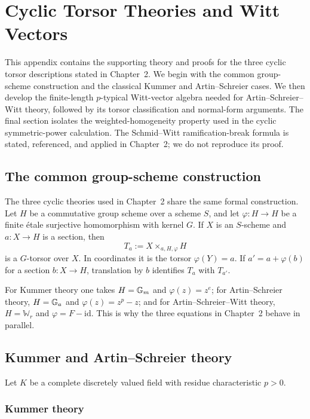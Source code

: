 \chapter{Cyclic Torsor Theories and Witt Vectors}
\label{appendix:witt_vector_algebra}
\label{appendix:cyclic_torsor_theories}

This appendix contains the supporting theory and proofs for the three cyclic
torsor descriptions stated in Chapter~2. We begin with the common
group-scheme construction and the classical Kummer and Artin--Schreier cases.
We then develop the finite-length \(p\)-typical Witt-vector algebra needed for
Artin--Schreier--Witt theory, followed by its torsor classification and
normal-form arguments. The final section isolates the weighted-homogeneity
property used in the cyclic symmetric-power calculation. The Schmid--Witt
ramification-break formula is stated, referenced, and applied in Chapter~2;
we do not reproduce its proof.

\providecommand{\bW}{\mathbb{W}}

\section{The common group-scheme construction}

The three cyclic theories used in Chapter~2 share the same formal
construction. Let $H$ be a commutative group scheme over a scheme $S$, and let
$\varphi:H\to H$ be a finite \'etale surjective homomorphism with kernel
$G$. If $X$ is an $S$-scheme and $a:X\to H$ is a section, then
\[
T_a:=X\times_{a,H,\varphi}H
\]
is a $G$-torsor over $X$. In coordinates it is the torsor
$\varphi(Y)=a$. If $a'=a+\varphi(b)$ for a section $b:X\to H$, translation
by $b$ identifies $T_a$ with $T_{a'}$.

For Kummer theory one takes $H=\mathbb{G}_m$ and $\varphi(z)=z^e$; for
Artin--Schreier theory, $H=\mathbb{G}_a$ and $\varphi(z)=z^p-z$; and for
Artin--Schreier--Witt theory, $H=\bW_r$ and
$\varphi=F-\mathrm{id}$. This is why the three equations in Chapter~2 behave
in parallel.

\section{Kummer and Artin--Schreier theory}
\label{appendix:kummer_and_as_proofs}

Let $K$ be a complete discretely valued field with residue characteristic
$p>0$.

\subsection{Kummer theory}

